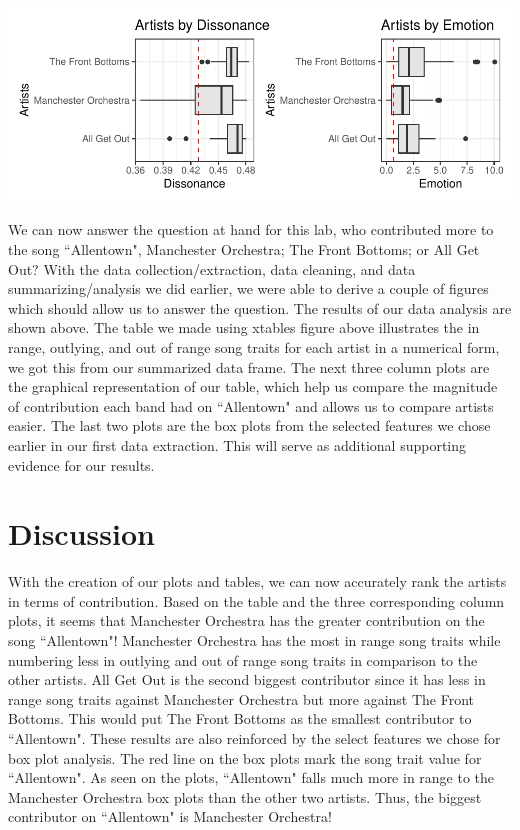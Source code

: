 \documentclass{article}\usepackage[]{graphicx}\usepackage[]{xcolor}
\makeatletter
\def\maxwidth{ %
  \ifdim\Gin@nat@width>\linewidth
    \linewidth
  \else
    \Gin@nat@width
  \fi
}
\newenvironment{knitrout}{}{} %
\makeatother
\begin{document}
\begin{knitrout}
\color{fgcolor}
\includegraphics[width=\maxwidth]{figure/unnamed-chunk-3-1} 
\end{knitrout}

\begin{multicols}{2} 
We can now answer the question at hand for this lab, who contributed more to the song ``Allentown", Manchester Orchestra; The Front Bottoms; or All Get Out? With the data collection/extraction, data cleaning, and data summarizing/analysis we did earlier, we were able to derive a couple of figures which should allow us to answer the question. The results of our data analysis are shown above. The table we made using xtables \citep{xtable} figure above illustrates the in range, outlying, and out of range song traits for each artist in a numerical form, we got this from our summarized data frame. The next three column plots are the graphical representation of our table, which help us compare the magnitude of contribution each band had on ``Allentown" and allows us to compare artists easier. The last two plots are the box plots from the selected features we chose earlier in our first data extraction. This will serve as additional supporting evidence for our results. 



\columnbreak
\section{Discussion}
With the creation of our plots and tables, we can now accurately rank the artists in terms of contribution. Based on the table and the three corresponding column plots, it seems that Manchester Orchestra has the greater contribution on the song ``Allentown"! Manchester Orchestra has the most in range song traits while numbering less in outlying and out of range song traits in comparison to the other artists. All Get Out is the second biggest contributor since it has less in range song traits against Manchester Orchestra but more against The Front Bottoms. This would put The Front Bottoms as the smallest contributor to ``Allentown". These results are also reinforced by the select features we chose for box plot analysis. The red line on the box plots mark the song trait value for ``Allentown". As seen on the plots, ``Allentown" falls much more in range to the Manchester Orchestra box plots than the other two artists. Thus, the biggest contributor on ``Allentown" is Manchester Orchestra!


\end{multicols}
\end{document}

